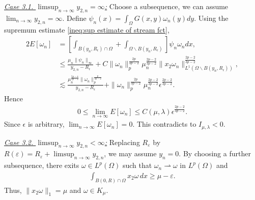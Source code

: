 \documentclass[11pt,letterpaper]{amsart}
\theoremstyle{definition}
\theoremstyle{remark}
\renewcommand{\O}{\Omega}
\newcommand{\eps}{\epsilon}
\numberwithin{equation}{section}
\begin{document}
\underline{\textit{Case 3.1. $\limsup_{n\to\infty} y_{2,n} = \infty$:}} Choose a subsequence, we can assume $\lim_{n\to\infty} y_{2,n} = \infty$. Define $\psi_n(x)=\int_{\O}G(x,y)\omega_n(y)dy$. Using the supremum estimate \eqref{ineq:sup estimate of stream fct},
\begin{align*}
    2E[\omega_n] & = \left[ \int_{ B(y_n,R_\eps) \cap \O } + \int_{ \O\backslash B(y_n,R_\eps) }\right] \psi_n \omega_n dx, \\
    & \leq \frac{\mu_n\|\psi_n\|_{\infty}}{y_{2,n}-R_\eps} + C \|\omega_n\|_p^{\frac{2p}{3p-2}}\mu_n^{\frac{2p-2}{3p-2}}\|x_2\omega_n\|_{L^1(\O\backslash B(y_n,R_\eps))}^{\frac{2p-2}{3p-2}}, \\
    & \lesssim \frac{\mu_n^{\frac{5p-4}{3p-2}}\|\omega_n\|_p^{\frac{p}{3p-2}}}{y_{2,n}-R_\eps} + \|\omega_n\|_p^{\frac{2p}{3p-2}}\mu_n^{\frac{2p-2}{3p-2}}\eps^{\frac{2p-2}{3p-2}}.
\end{align*}
Hence
\begin{align*}
    0\leq \lim_{n\to\infty} E[\omega_n] 
    \leq C(\mu,\lambda)\eps^{\frac{2p-2}{3p-2}}.
\end{align*}
Since $\eps$ is arbitrary, $ \lim_{n\to\infty} E[\omega_n]=0$. This contradicts to $I_{\mu,\lambda}<0$.

\underline{\textit{Case 3.2. $\limsup_{n\to\infty} y_{2,n} < \infty$:}} Replacing $R_\varepsilon$ by $R(\varepsilon)=R_\varepsilon+\limsup_{n\to\infty}y_{2,n}$, we may assume $y_n=0$. By choosing a further subsequence, there exits $\omega\in L^p(\O)$ such that $\omega_n \rightharpoonup \omega$ in $L^p(\O)$ and
\begin{align}
    \int_{B(0,R)\cap\O} x_2 \omega \,dx \ge \mu - \varepsilon. \label{ineq:compactness of weak limit}
\end{align}
Thus, $\|x_2\omega\|_{1} = \mu$ and $\omega \in K_\mu$.
\end{document}

